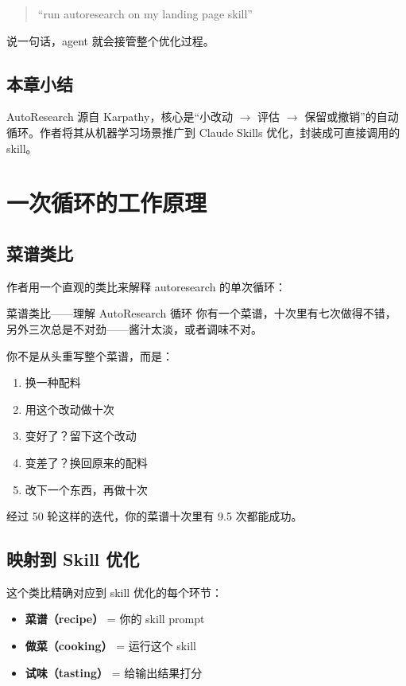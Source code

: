 \documentclass[a4paper]{article}
\begin{document}
\begin{quote}
``run autoresearch on my landing page skill''
\end{quote}

说一句话，agent 就会接管整个优化过程。

\subsection{本章小结}

AutoResearch 源自 Karpathy，核心是``小改动 $\to$ 评估 $\to$ 保留或撤销''的自动循环。作者将其从机器学习场景推广到 Claude Skills 优化，封装成可直接调用的 skill。

\section{一次循环的工作原理}

\subsection{菜谱类比}

作者用一个直观的类比来解释 autoresearch 的单次循环：

\begin{knowledgebox}{菜谱类比——理解 AutoResearch 循环}
你有一个菜谱，十次里有七次做得不错，另外三次总是不对劲——酱汁太淡，或者调味不对。

你不是从头重写整个菜谱，而是：
\begin{enumerate}
    \item 换一种配料
    \item 用这个改动做十次
    \item 变好了？留下这个改动
    \item 变差了？换回原来的配料
    \item 改下一个东西，再做十次
\end{enumerate}

经过 50 轮这样的迭代，你的菜谱十次里有 9.5 次都能成功。
\end{knowledgebox}

\subsection{映射到 Skill 优化}

这个类比精确对应到 skill 优化的每个环节：

\begin{itemize}
    \item \textbf{菜谱（recipe）} = 你的 skill prompt
    \item \textbf{做菜（cooking）} = 运行这个 skill
    \item \textbf{试味（tasting）} = 给输出结果打分
\end{itemize}
\end{document}
